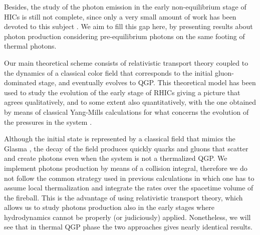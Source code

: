 \documentclass[aps,prc,a4paper,nofootinbib,
preprintnumbers,superscriptaddress,twocolumn,showpacs,showkeys]{revtex4}
\begin{document}
Besides, the study of the photon emission in the 
early non-equilibrium stage of HICs is still not complete, since only a very small
amount of work has been devoted to this subject \cite{Berges:2017eom,Linnyk:2015tha,Linnyk:2013wma,Linnyk:2015rco,
Vovchenko:2016mtf,Chiu:2012ij,Greif:2016jeb}.
We aim to fill this gap here, by presenting results about photon production 
considering pre-equilibrium photons on the same footing of thermal photons.  

Our main theoretical scheme consists of relativistic transport theory coupled
to the dynamics of a classical color field that corresponds to the initial gluon-dominated stage, and eventually
evolves to QGP.
This theoretical model has been used to study the evolution of the early stage of RHICs
\cite{Ryblewski:2013eja,Ruggieri:2015yea} giving a picture that agrees qualitatively,
and to some extent also quantitatively, with the one obtained by means of classical Yang-Mills calculations
for what concerns the evolution of the pressures in the system \cite{Gelis:2013rba}.

Although the initial state is represented by a classical
field that mimics the Glasma \cite{Lappi:2006fp}, the decay of the field
produces quickly quarks and gluons that scatter and create photons even when the system
is not a thermalized QGP. We implement photons production by means of a collision integral,
therefore we do not follow the common strategy used in previous calculations
in which one has to assume local thermalization 
and integrate the rates over the spacetime volume of the fireball.
This is the advantage of using relativistic transport theory,
which allows us to study photons production also in the early stages 
where hydrodynamics cannot be properly (or judiciously) applied.
Nonetheless, we will see that in thermal QGP phase the two approaches gives nearly identical results.
\end{document}

